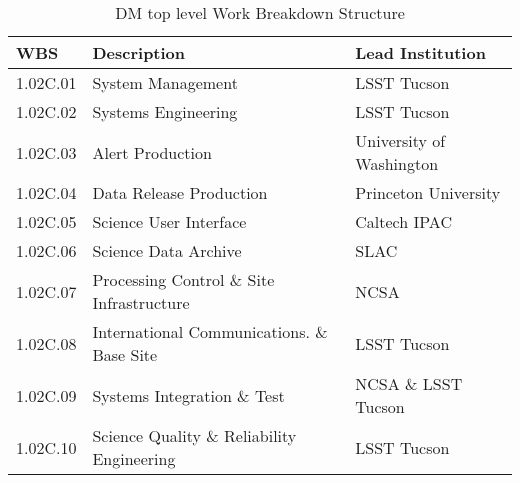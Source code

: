\begin{table}
\caption{DM top level Work Breakdown Structure \label{tab:wbs}}
\begin{tabular}[htb]{|l|l|l|} \hline
\textbf{WBS}  &  \textbf{Description}   &  \textbf{Lead Institution}\\ \hline
1.02C.01& System Management                       &  LSST Tucson \\ \hline
1.02C.02& Systems Engineering                     &  LSST Tucson \\ \hline
1.02C.03& Alert Production                        &  University of Washington\\ \hline
1.02C.04& Data Release Production                 &  Princeton University\\ \hline
1.02C.05& Science User Interface                  &  Caltech IPAC\\ \hline
1.02C.06& Science Data Archive                    &  SLAC\\ \hline
1.02C.07& Processing Control \& Site Infrastructure & NCSA\\ \hline
1.02C.08& International Communications. \& Base Site&  LSST Tucson \\ \hline
1.02C.09& Systems Integration \& Test               & NCSA \& LSST Tucson \\ \hline
1.02C.10& Science Quality \& Reliability Engineering& LSST Tucson \\ \hline
\end{tabular}
\end{table}
